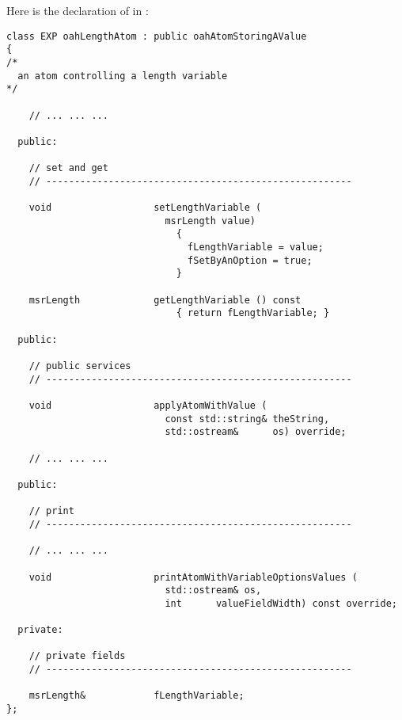 Here is the declaration of  in :
\begin{lstlisting}[language=CPlusPlus]
class EXP oahLengthAtom : public oahAtomStoringAValue
{
/*
  an atom controlling a length variable
*/

	// ... ... ...

  public:

    // set and get
    // ------------------------------------------------------

    void                  setLengthVariable (
                            msrLength value)
                              {
                                fLengthVariable = value;
                                fSetByAnOption = true;
                              }

    msrLength             getLengthVariable () const
                              { return fLengthVariable; }

  public:

    // public services
    // ------------------------------------------------------

    void                  applyAtomWithValue (
                            const std::string& theString,
                            std::ostream&      os) override;

	// ... ... ...

  public:

    // print
    // ------------------------------------------------------

	// ... ... ...

    void                  printAtomWithVariableOptionsValues (
                            std::ostream& os,
                            int      valueFieldWidth) const override;

  private:

    // private fields
    // ------------------------------------------------------

    msrLength&            fLengthVariable;
};
\end{lstlisting}

